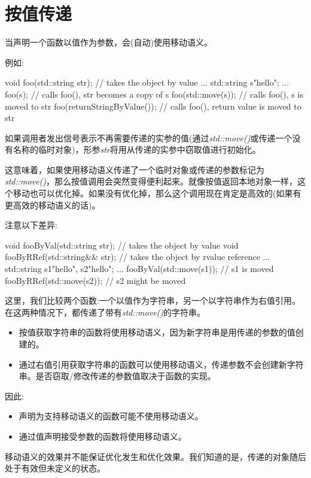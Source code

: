 \section{按值传递}
当声明一个函数以值作为参数，会(自动)使用移动语义。

例如:

\begin{cppcode}
void foo(std::string str); // takes the object by value
...
std::string s{"hello"};
...
foo(s); // calls foo(), str becomes a copy of s
foo(std::move(s)); // calls foo(), s is moved to str
foo(returnStringByValue()); // calls foo(), return value is moved to str
\end{cppcode}

如果调用者发出信号表示不再需要传递的实参的值(通过\textit{std::move()}或传递一个没有名称的临时对象)，形参\textit{str}将用从传递的实参中窃取值进行初始化。

这意味着，如果使用移动语义传递了一个临时对象或传递的参数标记为\textit{std::move()}，那么按值调用会突然变得便利起来。就像按值返回本地对象一样，这个移动也可以优化掉。如果没有优化掉，那么这个调用现在肯定是高效的(如果有更高效的移动语义的话)。

注意以下差异:

\begin{cppcode}
void fooByVal(std::string str); // takes the object by value
void fooByRRef(std::string&& str); // takes the object by rvalue reference
...
std::string s1{"hello"}, s2{"hello"};
...
fooByVal(std::move(s1)); // s1 is moved
fooByRRef(std::move(s2)); // s2 might be moved
\end{cppcode}

这里，我们比较两个函数:一个以值作为字符串，另一个以字符串作为右值引用。在这两种情况下，都传递了带有\textit{std::move()}的字符串。

\begin{itemize}
	\item 按值获取字符串的函数将使用移动语义，因为新字符串是用传递的参数的值创建的。
	\item 通过右值引用获取字符串的函数可以使用移动语义，传递参数不会创建新字符串。是否窃取/修改传递的参数值取决于函数的实现。
\end{itemize}

因此:

\begin{itemize}
	\item 声明为支持移动语义的函数可能不使用移动语义。
	\item 通过值声明接受参数的函数将使用移动语义。
\end{itemize}

移动语义的效果并不能保证优化发生和优化效果。我们知道的是，传递的对象随后处于有效但未定义的状态。













